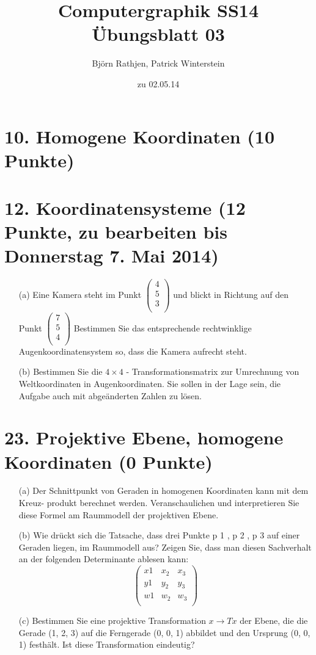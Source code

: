 \documentclass[11pt]{article}
\title{Computergraphik SS14\\Übungsblatt 03}
\author{Björn Rathjen, Patrick Winterstein}
\date{zu 02.05.14}
\begin{document}
\maketitle
\newpage

\section*{10. Homogene Koordinaten (10 Punkte)}

\section*{12. Koordinatensysteme (12 Punkte, zu bearbeiten bis Donnerstag 7. Mai 2014)}
\begin{enumerate}
\item[(a)] Eine Kamera steht im Punkt
$\begin{pmatrix}
4 \\
5 \\
3 \\
\end{pmatrix}$
und blickt in Richtung auf den Punkt
$\begin{pmatrix}
7 \\
5 \\
4 \\
\end{pmatrix}$
Bestimmen Sie das entsprechende rechtwinklige Augenkoordinatensystem so, dass
die Kamera aufrecht steht.
\item[(b)] Bestimmen Sie die $4 \times 4$ - Transformationsmatrix zur Umrechnung von Weltkoordinaten in Augenkoordinaten. Sie sollen in der Lage sein, die Aufgabe auch mit abgeänderten Zahlen zu lösen.
\end{enumerate}
\section*{23. Projektive Ebene, homogene Koordinaten (0 Punkte)}
\begin{enumerate}
\item[(a)] Der Schnittpunkt von Geraden in homogenen Koordinaten kann mit dem Kreuz- produkt berechnet werden. Veranschaulichen und interpretieren Sie diese Formel am Raummodell der projektiven Ebene.
\item[(b)] Wie drückt sich die Tatsache, dass drei Punkte p 1 , p 2 , p 3 auf einer Geraden liegen, im Raummodell aus? Zeigen Sie, dass man diesen Sachverhalt an der folgenden Determinante ablesen kann:
$$\begin{pmatrix}
x 1 & x_2 & x_3 \\
y 1 & y_2 & y_3 \\
w 1 & w_2 & w_3 \\
\end{pmatrix}$$
\item[(c)] Bestimmen Sie eine projektive Transformation $x \rightarrow T x$ der Ebene, die die Gerade (1, 2, 3) auf die Ferngerade (0, 0, 1) abbildet und den Ursprung (0, 0, 1) festhält. Ist diese Transformation eindeutig?
\end{enumerate}
\end{document}
